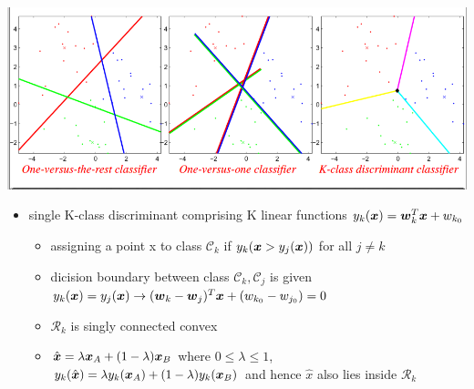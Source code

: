 \documentclass[11pt]{article}
\begin{document}
\begin{center}
\includegraphics[width=.8\textwidth]{MultipleClasses}
\end{center}
\begin{itemize}
\item single K-class discriminant comprising K linear functions
\(y_k(\boldsymbol{x})=\boldsymbol{w}_k^T\boldsymbol{x}+w_{k_0}\)
\begin{itemize}
\item assigning a point x to class \(\mathcal{C}_k\) if
\(y_k(\boldsymbol{x}>y_j(\boldsymbol{x}))\) for all \(j\neq k\)
\item dicision boundary between class \(\mathcal{C}_k, \mathcal{C}_j\) is given
\(y_k(\boldsymbol{x})=y_j(\boldsymbol{x})\to
        (\boldsymbol{w}_k-\boldsymbol{w}_j)^T\boldsymbol{x}+(w_{k_0}-w_{j_0})=0\)
\item \(\mathcal{R}_k\) is singly connected convex
\item \(\hat{\boldsymbol{x}}=\lambda\boldsymbol{x}_A+(1-\lambda)\boldsymbol{x}_B\) where \(0\le\lambda\le
        1\), \(y_k(\hat{\boldsymbol{x}})=\lambda y_k(\boldsymbol{x}_A)+(1-\lambda)y_k(\boldsymbol{x}_B)\)
and hence \(\hat{x}\) also lies inside \(\mathcal{R}_k\)
\end{itemize}
\end{itemize}
\end{document}
